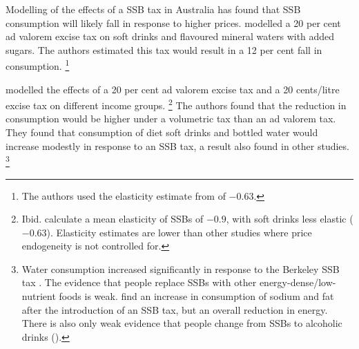 \documentclass[embargoed]{grattan}
\begin{document}
Modelling of the effects of a SSB tax in Australia has found that SSB consumption will likely fall in response to higher prices. \textcite{Veerman2016ImpactTaxSugar} modelled a 20 per cent ad valorem excise tax on soft drinks and flavoured mineral waters with added sugars.
The authors estimated this tax would result in a 12 per cent fall in consumption.%
\footnote{The authors used the elasticity estimate from \textcite{Sharma2014effectstaxingsugarsweetened} of \(-0.63\).}

\textcite{Sharma2014effectstaxingsugarsweetened} modelled the effects of a 20 per cent ad valorem excise tax and a 20 cents/litre excise tax on different income groups.%
\footnote{Ibid. calculate a mean elasticity of SSBs of \(-0.9\), with soft drinks less elastic (\(-0.63\)).
Elasticity estimates are lower than other studies where price endogeneity is not controlled for.} The authors found that the reduction in consumption would be higher under a volumetric tax than an ad valorem tax.
They found that consumption of diet soft drinks and bottled water would increase modestly in response to an SSB tax, a result also found in other studies.%
\footnote{Water consumption increased significantly in response to the Berkeley SSB tax \textcites{Colchero2016Beveragepurchasesstores}{Briggs2013Overallincomespecific}{Falbe2015Higherretailprices}.
The evidence that people replace SSBs with other energy-dense/low-nutrient foods is weak. \textcite{Zhen2014Predictingeffectssugar} find an increase in consumption of sodium and fat after the introduction of an SSB tax, but an overall reduction in energy.
There is also only weak evidence that people change from SSBs to alcoholic drinks (\textcite{Wansink2014cokecoorsfield}).}
\end{document}
